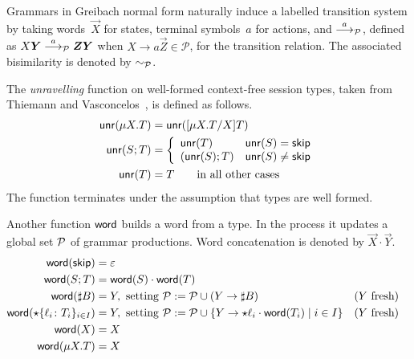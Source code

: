 
Grammars in Greibach normal form naturally induce a labelled
transition system by taking words~$\vec X$ for states, terminal
symbols~$a$ for actions, and $\stackrel{a}{\longrightarrow}_\mathcal P$, defined as
$X\vec Y\LTSderivesP \vec Z\vec Y$ when
$X \rightarrow a\vec Z \in \mathcal P$, for the transition relation.
The associated bisimilarity is denoted by $\sim_\mathcal P$.


The \emph{unravelling} function on well-formed context-free session
types, taken from Thiemann and Vasconcelos~\cite{thiemann2016context},
is defined as follows.
%
\begin{align*}
  \Unravel(\mu X.T) & = \Unravel(\subs{\mu X.T}XT)
  \\
  \Unravel (S;T) &= \left\{%
  \begin{array}{ll}
    \Unravel(T) & \Unravel(S) = \skipk
    \\
    (\Unravel(S); T) & \Unravel(S) \ne \skipk
  \end{array}
                        \right.
  \\
  \Unravel (T) &= T \qquad \text{in all other cases}
\end{align*}
%
The function terminates under the assumption that types are well
formed. 


Another function $\mathsf{word}$ builds a word from a type. In the process it updates a
global set $\mathcal P$ of grammar productions. Word concatenation is
denoted by $\vec X\cdot\vec Y$.
%
\begin{align*}
  \mathsf{word}(\mathsf{skip}) &= \varepsilon
  \\
  \mathsf{word}(S;T) &= \mathsf{word}(S) \cdot \mathsf{word}(T)
  \\
  \mathsf{word}(\sharp B) &=
     Y,
     \text{ setting } \mathcal P := \mathcal P \cup (Y \rightarrow \sharp B)
    && (Y\text{ fresh})
  \\
  \mathsf{word}(\star\{\ell_i\colon T_i\}_{i\in I}) &=
     Y,
    \text{ setting } \mathcal P := \mathcal P \cup \{Y \rightarrow\star \ell_i\cdot \mathsf{word}(T_i) \mid i\in I\}
    && (Y\text{ fresh})
  \\
  \mathsf{word}(X) &= X
  \\
  \mathsf{word}(\mu X.T) &= X
\end{align*}


